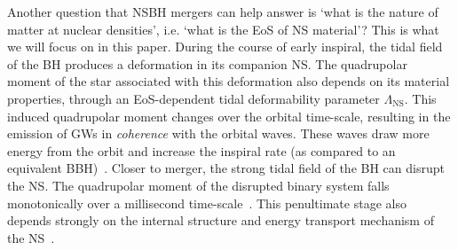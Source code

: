 \documentclass[aps,prd,amsmath,floats,floatfix, twocolumn,
superscriptaddress,nofootinbib,showpacs]{revtex4-1}
\newcommand{\red}{\textcolor{red}}
\newcommand{\lambdans}{\Lambda_\mathrm{NS}}
\begin{document}

Another question that NSBH mergers can help answer is `what is the 
nature of matter at nuclear densities', i.e. `what is the EoS of NS material'?
This is what we will focus on in this paper.
% 
During the course of early inspiral, the tidal field of the BH produces a
deformation in its companion NS. The quadrupolar moment of the star associated
with this deformation also depends on its material properties, through an EoS-dependent
tidal deformability parameter $\lambdans$. This induced quadrupolar moment
changes over the orbital time-scale, resulting in the emission of GWs in {\it
coherence} with the orbital waves.
These waves draw more energy from the orbit and increase the inspiral rate (as
compared to an equivalent BBH)~\cite{Flanagan2008}.
% 
% 
Closer to merger, the strong tidal field of the BH can disrupt the NS. The
quadrupolar moment of the disrupted binary system falls monotonically over a
millisecond time-scale~\cite{Kyutoku:2010zd,Lackey:2013axa,Lovelace:2013vma,Foucart:2015a,
Pannarale:2015jia}.
% 
This penultimate stage also depends strongly on the internal structure and energy
transport mechanism of the NS~\cite{}.




% 
\end{document}
